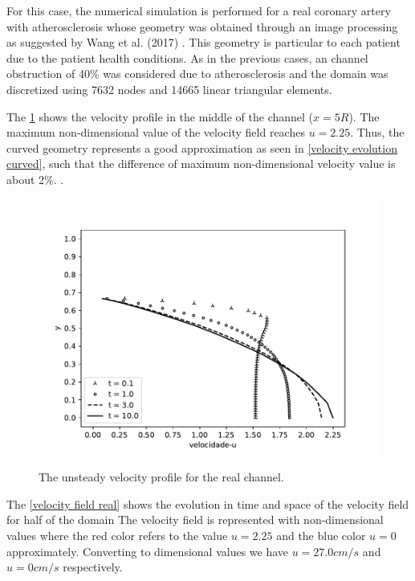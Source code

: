 For this case, the numerical simulation is performed for a real 
coronary artery with atherosclerosis whose geometry was obtained 
through an image processing as suggested by Wang et al. (2017) 
\cite{wang2017}. This geometry is particular to each patient 
due to the patient health conditions. As in the previous cases, 
an channel obstruction of 40\% was considered due to atherosclerosis 
and the domain was discretized using 7632 nodes and 14665 linear 
triangular elements. 

\par 
The \ref{velocity evolution real} shows the velocity profile 
in the middle of the channel ($x=5R$). The maximum non-dimensional
 value of the velocity field reaches $u=2.25$. Thus, the 
curved geometry represents a good approximation as seen in 
\ref{velocity evolution curved}, 
such that the difference of maximum non-dimensional velocity value 
is about 2\%.
.

\begin{figure}[H]
     \centering
     \includegraphics[scale=1]{./02_chaps/cap_solution/figure/vel_Real_evol.pdf}\\
     \caption{The unsteady velocity profile for the real channel.}
     \label{velocity evolution real}
\end{figure}

\newpage
The 
\ref{velocity field real} 
shows the evolution in time and space of the velocity field for half of the
domain The velocity field is represented with non-dimensional values where the red color
refers to the value 
$u=2.25$
and the blue color 
$u=0$
approximately. 
Converting to dimensional
values we have 
$u = 27.0cm/s$
 and 
$u = 0cm/s$ 
respectively.

